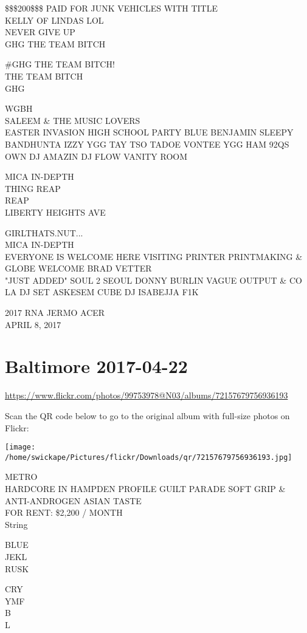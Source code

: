 \documentclass[10pt,letterpaper]{article}
\begin{document}
\$\$\$200\$\$\$ PAID FOR JUNK VEHICLES WITH TITLE\\
KELLY OF LINDAS LOL\\
NEVER GIVE UP\\
GHG THE TEAM BITCH

\#GHG THE TEAM BITCH!\\
THE TEAM BITCH\\
GHG

WGBH\\
SALEEM \& THE MUSIC LOVERS\\
EASTER INVASION HIGH SCHOOL PARTY BLUE BENJAMIN SLEEPY BANDHUNTA IZZY YGG TAY TSO TADOE VONTEE YGG HAM 92QS OWN DJ AMAZIN DJ FLOW VANITY ROOM

MICA IN{-}DEPTH\\
THING REAP\\
REAP\\
LIBERTY HEIGHTS AVE

GIRLTHATS.NUT...\\
MICA IN{-}DEPTH\\
EVERYONE IS WELCOME HERE VISITING PRINTER PRINTMAKING \& GLOBE WELCOME BRAD VETTER\\
"JUST ADDED" SOUL 2 SEOUL DONNY BURLIN VAGUE OUTPUT \& CO LA DJ SET ASKESEM CUBE DJ ISABEJJA F1K

2017 RNA JERMO ACER\\
APRIL 8, 2017
\pagebreak

\section*{Baltimore 2017-04-22}

\url{https://www.flickr.com/photos/99753978@N03/albums/72157679756936193}

Scan the QR code below to go to the original album with full-size photos on Flickr:

\texttt{[image: /home/swickape/Pictures/flickr/Downloads/qr/72157679756936193.jpg]}
\pagebreak

METRO\\
HARDCORE IN HAMPDEN PROFILE GUILT PARADE SOFT GRIP \& ANTI{-}ANDROGEN ASIAN TASTE\\
FOR RENT: \$2,200 / MONTH\\
String

BLUE\\
JEKL\\
RUSK

CRY\\
YMF\\
B\\
L
\end{document}
